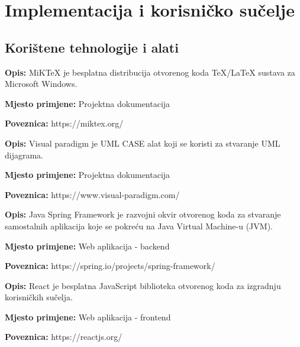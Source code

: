 \chapter{Implementacija i korisničko sučelje}
		
		
		\section{Korištene tehnologije i alati}
			 
			 \noindent {}
			 \begin{packed_item}
			 	\item  \textbf{Opis:} MiKTeX je besplatna distribucija otvorenog koda TeX/LaTeX sustava za Microsoft Windows.
			 	\item  \textbf{Mjesto primjene:} Projektna dokumentacija
			 	\item  \textbf{Poveznica:} https://miktex.org/
			 \end{packed_item}
		
			\noindent {}
			\begin{packed_item}
				\item  \textbf{Opis:} Visual paradigm je UML CASE alat koji se koristi za stvaranje UML dijagrama.
				\item  \textbf{Mjesto primjene:} Projektna dokumentacija
				\item  \textbf{Poveznica:} https://www.visual-paradigm.com/
			\end{packed_item}
		
			\noindent {}
			\begin{packed_item}
				\item  \textbf{Opis:} Java Spring Framework je razvojni okvir otvorenog koda za stvaranje samostalnih aplikacija koje se pokreću na Java Virtual Machine-u (JVM).
				\item  \textbf{Mjesto primjene:} Web aplikacija - backend
				\item  \textbf{Poveznica:} https://spring.io/projects/spring-framework/
			\end{packed_item}
		
			\noindent {}
			\begin{packed_item}
				\item  \textbf{Opis:} React je besplatna JavaScript biblioteka otvorenog koda za izgradnju korisničkih sučelja.
				\item  \textbf{Mjesto primjene:} Web aplikacija - frontend
				\item  \textbf{Poveznica:} https://reactjs.org/
			\end{packed_item}
		

